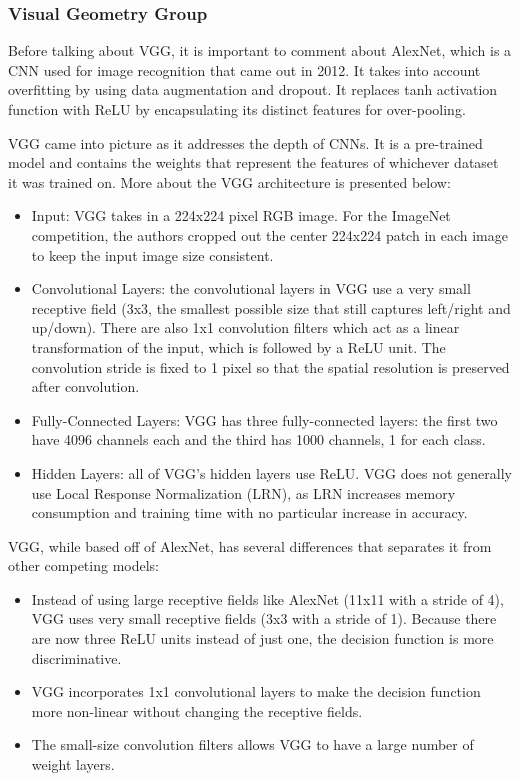 \documentclass{article}
\begin{document}
    \subsubsection{Visual Geometry Group}

    Before talking about VGG, it is important to comment about AlexNet, which is a CNN used for image recognition that came out in 2012. It takes into account overfitting by using data augmentation and dropout. It replaces tanh activation function with ReLU by encapsulating its distinct features for over-pooling.
    
    VGG came into picture as it addresses the depth of CNNs. It is a pre-trained model and contains the weights that represent the features of whichever dataset it was trained on. More about the VGG architecture is presented below:

    \begin{itemize}
        \item Input: VGG takes in a 224x224 pixel RGB image. For the ImageNet competition, the authors cropped out the center 224x224 patch in each image to keep the input image size consistent.
        \item Convolutional Layers: the convolutional layers in VGG use a very small receptive field (3x3, the smallest possible size that still captures left/right and up/down). There are also 1x1 convolution filters which act as a linear transformation of the input, which is followed by a ReLU unit. The convolution stride is fixed to 1 pixel so that the spatial resolution is preserved after convolution.
        \item Fully-Connected Layers: VGG has three fully-connected layers: the first two have 4096 channels each and the third has 1000 channels, 1 for each class.
        \item Hidden Layers: all of VGG's hidden layers use ReLU. VGG does not generally use Local Response Normalization (LRN), as LRN increases memory consumption and training time with no particular increase in accuracy.
    \end{itemize}

    VGG, while based off of AlexNet, has several differences that separates it from other competing models:

    \begin{itemize}
        \item Instead of using large receptive fields like AlexNet (11x11 with a stride of 4), VGG uses very small receptive fields (3x3 with a stride of 1). Because there are now three ReLU units instead of just one, the decision function is more discriminative.
        \item VGG incorporates 1x1 convolutional layers to make the decision function more non-linear without changing the receptive fields.
        \item The small-size convolution filters allows VGG to have a large number of weight layers.
    \end{itemize}
    
\end{document}
